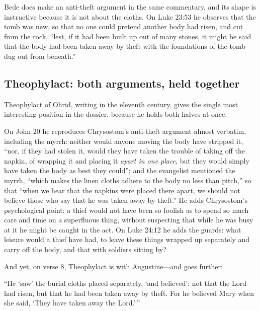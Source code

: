 Bede does make an anti-theft argument in the same commentary, and its shape is
instructive because it is not about the cloths. On Luke 23:53 he observes that
the tomb was new, so that no one could pretend another body had risen, and cut
from the rock, ``lest, if it had been built up out of many stones, it might be
said that the body had been taken away by theft with the foundations of the
tomb dug out from beneath.''

\subsection{Theophylact: both arguments, held together}

Theophylact of Ohrid, writing in the eleventh century, gives the single most
interesting position in the dossier, because he holds both halves at once.

On John 20 he reproduces Chrysostom's anti-theft argument almost verbatim,
including the myrrh: neither would anyone moving the body have stripped it,
``nor, if they had stolen it, would they have taken the trouble of taking off
the napkin, of wrapping it and placing it \emph{apart in one place}, but they
would simply have taken the body as best they could''; and the evangelist
mentioned the myrrh, ``which makes the linen cloths adhere to the body no less
than pitch,'' so that ``when we hear that the napkins were placed there apart,
we should not believe those who say that he was taken away by theft.'' He adds
Chrysostom's psychological point: a thief would not have been so foolish as to
spend so much care and time on a superfluous thing, without suspecting that
while he was busy at it he might be caught in the act. On Luke 24:12 he adds the guards: what leisure would a
thief have had, to leave these things wrapped up separately and carry off the
body, and that with soldiers sitting by?

And yet, on verse 8, Theophylact is with Augustine---and goes further:

\begin{studyframe}\small
``He `saw' the burial cloths placed separately, `and believed': not that the
Lord had risen, but that he had been taken away by theft. For he believed Mary
when she said, `They have taken away the Lord.'\,''
\end{studyframe}

